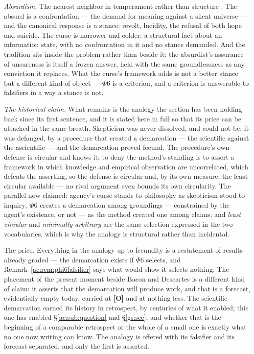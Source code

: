 \documentclass[11pt]{article}
\numberwithin{equation}{section}
\theoremstyle{plain}
\theoremstyle{definition}
\theoremstyle{remark}
\begin{document}
\emph{Absurdism.} The nearest neighbor in temperament rather than structure \cite{Camus42}. The absurd is a confrontation --- the demand for meaning against a silent universe --- and the canonical response is a stance: revolt, lucidity, the refusal of both hope and suicide. The curse is narrower and colder: a structural fact about an information state, with no confrontation in it and no stance demanded. And the tradition sits inside the problem rather than beside it: the absurdist's assurance of unsureness is itself a frozen answer, held with the same groundlessness as any conviction it replaces. What the curse's framework adds is not a better stance but a different kind of object --- $\Phi6$ is a criterion, and a criterion is answerable to falsifiers in a way a stance is not.

\emph{The historical claim.} What remains is the analogy the section has been holding back since its first sentence, and it is stated here in full so that its price can be attached in the same breath. Skepticism was never dissolved, and could not be; it was defanged, by a procedure that created a demarcation --- the scientific against the ascientific --- and the demarcation proved fecund. The procedure's own defense is circular and knows it: to deny the method's standing is to assert a framework in which knowledge and empirical observation are uncorrelated, which defeats the asserting, so the defense is circular and, by its own measure, the least circular available --- no rival argument even bounds its own circularity. The parallel now claimed: agency's curse stands to philosophy as skepticism stood to inquiry; $\Phi6$ creates a demarcation among groundings --- constrained by the agent's existence, or not --- as the method created one among claims; and \emph{least circular} and \emph{minimally arbitrary} are the same selection expressed in the two vocabularies, which is why the analogy is structural rather than incidental.

The price. Everything in the analogy up to fecundity is a restatement of results already graded --- the demarcation exists if $\Phi6$ selects, and Remark~\ref{ac:rem:phi6falsifier} says what would show it selects nothing. The placement of the present moment beside Bacon and Descartes is a different kind of claim: it asserts that the demarcation will produce work, and that is a forecast, evidentially empty today, carried at \textbf{[O]} and at nothing less. The scientific demarcation earned its history in retrospect, by centuries of what it enabled; this one has enabled \S\ref{ac:sub:question} and \S\ref{gs:sec}, and whether that is the beginning of a comparable retrospect or the whole of a small one is exactly what no one now writing can know. The analogy is offered with its falsifier and its forecast separated, and only the first is asserted.
\end{document}
